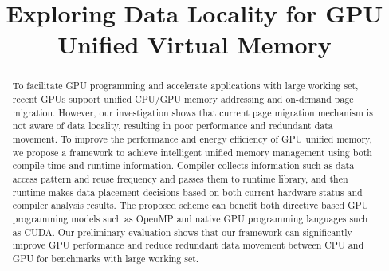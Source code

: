 \documentclass[sigconf]{acmart}
\begin{document}
\title{Exploring Data Locality for GPU Unified Virtual Memory}




\begin{abstract}

To facilitate GPU programming and accelerate applications with large working set, recent GPUs support unified CPU/GPU memory addressing and on-demand page migration. However, our investigation shows that current page migration mechanism is not aware of data locality, resulting in poor performance and redundant data movement. To improve the performance and energy efficiency of GPU unified memory, we propose a framework to achieve intelligent unified memory management using both compile-time and runtime information. Compiler collects information such as data access pattern and reuse frequency and passes them to runtime library, and then runtime makes data placement decisions based on both current hardware status and compiler analysis results. The proposed scheme can benefit both directive based GPU programming models such as OpenMP and native GPU programming languages such as CUDA. Our preliminary evaluation shows that our framework can significantly improve GPU performance and reduce redundant data movement between CPU and GPU for benchmarks with large working set.

\end{abstract}

%
%




\maketitle




 
\end{document}
